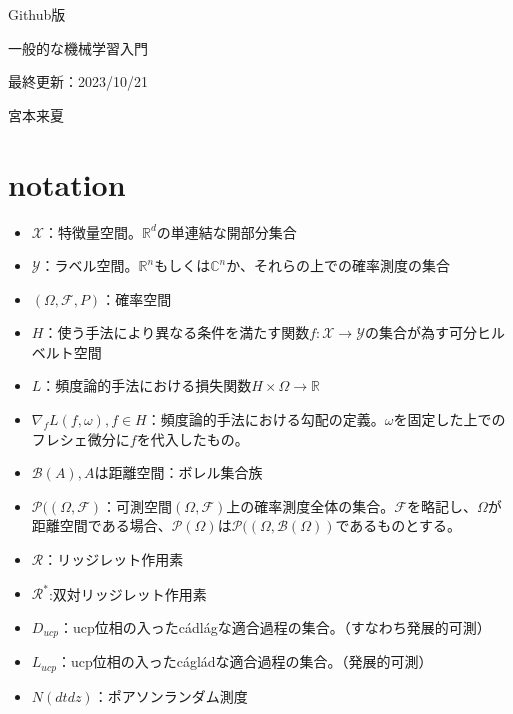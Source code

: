 \documentclass{jsarticle}
\begin{document}
\begin{center}
  
  \Huge Github版 \par
  \vspace{15mm}
  \Huge 一般的な機械学習入門\par
  \vspace{90mm}
  \Large 最終更新：2023/10/21 \par
  \Large 宮本来夏\par

\end{center}
\thispagestyle{empty}
\clearpage
\addtocounter{page}{-1}







\newpage


 \tableofcontents
 \clearpage
\section*{notation}
\begin{itemize}
\item $\mathcal{X}$：特徴量空間。$\mathbb{R}^d$の単連結な開部分集合
\item $\mathcal{Y}$：ラベル空間。$\mathbb{R}^n$もしくは$\mathbb{C}^n$か、それらの上での確率測度の集合
\item $(\Omega,\mathcal{F},P)$：確率空間
\item $H$：使う手法により異なる条件を満たす関数$f:\mathcal{X}\to\mathcal{Y}$の集合が為す可分ヒルベルト空間
\item $L$：頻度論的手法における損失関数$H\times\Omega \to \mathbb{R}$
\item $\nabla_f L(f,\omega),f\in H$：頻度論的手法における勾配の定義。$\omega$を固定した上でのフレシェ微分に$f$を代入したもの。
\item $\mathcal{B}(A),A$は距離空間：ボレル集合族
\item $\mathcal{P}((\Omega,\mathcal{F})$：可測空間$(\Omega,\mathcal{F})$上の確率測度全体の集合。$\mathcal{F}$を略記し、$\Omega$が距離空間である場合、$\mathcal{P}(\Omega)$は$\mathcal{P}((\Omega,\mathcal{B}(\Omega))$であるものとする。
\item $\mathcal{R}$：リッジレット作用素
\item $\mathcal{R}^*$:双対リッジレット作用素
\item $D_{ucp}$：ucp位相の入ったc\'{a}dl\'{a}gな適合過程の集合。（すなわち発展的可測）
\item $L_{ucp}$：ucp位相の入ったc\'{a}gl\'{a}dな適合過程の集合。（発展的可測）
\item $N(dtdz)$：ポアソンランダム測度

\end{itemize}
\end{document}

